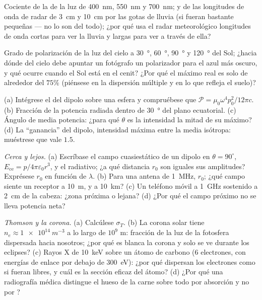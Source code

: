 \begin{exercise}[$\star$]\label{exo:b2:dipole-radiation:3}
Cociente de la  de la luz de \qty{400}{nm}, \qty{550}{nm} y
\qty{700}{nm}; y de las longitudes de onda de radar de \qty{3}{cm} y \qty{10}{cm} por
las gotas de lluvia (si fueran bastante pequeñas --- no lo son del todo); ¿por qué usa
el radar meteorológico longitudes de onda cortas para ver la lluvia y largas para ver
a través de ella?
\end{exercise}

\begin{exercise}[$\star$]\label{exo:b2:dipole-radiation:4}
Grado de polarización de la luz del cielo a \qty{30}{\degree}, \qty{60}{\degree},
\qty{90}{\degree} y \qty{120}{\degree} del Sol; ¿hacia dónde del cielo debe apuntar un
fotógrafo un polarizador para el azul más oscuro, y qué
ocurre cuando el Sol está en el cenit? ¿Por qué el máximo real es solo de alrededor del
$75\%$ (piénsese en la dispersión múltiple y en lo que refleja el suelo)?
\end{exercise}

\begin{exercise}[$\star\star$]\label{exo:b2:dipole-radiation:5}
(a) Intégrese el  del dipolo sobre una esfera y
compruébese que $\mathcal P = \mu_0\omega^4p_0^2/12\pi c$. (b) Fracción de la potencia
radiada dentro de \qty{30}{\degree} del plano ecuatorial. (c) Ángulo de
media potencia: ¿para qué $\theta$ es la intensidad la mitad de su máximo? (d) La
``ganancia'' del dipolo, intensidad máxima entre la media isótropa:
muéstrese que vale $1.5$.
\end{exercise}

\begin{exercise}[$\star\star$]\label{exo:b2:dipole-radiation:6}
\emph{Cerca y lejos.} (a) Escríbase el campo cuasiestático de un dipolo en
$\theta = 90^\circ$, $E_{\text{ce}} = p/4\pi\varepsilon_0r^3$, y el radiativo; ¿a qué
distancia $r_0$ son iguales sus amplitudes? Exprésese $r_0$ en función de
$\lambda$. (b) Para una antena de \qty{1}{MHz}, $r_0$; ¿qué campo siente un receptor
a \qty{10}{m}, y a \qty{10}{km}? (c) Un teléfono móvil a \qty{1}{GHz} sostenido
a \qty{2}{cm} de la cabeza: ¿zona próxima o lejana? (d) ¿Por qué el campo próximo
no se lleva potencia neta?
\end{exercise}

\begin{exercise}[$\star\star$]\label{exo:b2:dipole-radiation:7}
\emph{Thomson y la corona.} (a) Calcúlese $\sigma_T$. (b) La corona solar
tiene $n_e \approx \qty{1e14}{m^{-3}}$ a lo largo de $10^9$ m: fracción de la luz de la
fotosfera dispersada hacia nosotros; ¿por qué es blanca la corona y solo se ve
durante los eclipses? (c) Rayos X de \qty{10}{keV} sobre un átomo de carbono ($6$
electrones, con energías de enlace por debajo de \qty{300}{eV}): ¿por qué dispersan los electrones
como si fueran libres, y cuál es la sección eficaz del átomo? (d) ¿Por qué
una radiografía médica distingue el hueso de la carne sobre todo por
absorción y no por ?
\end{exercise}

